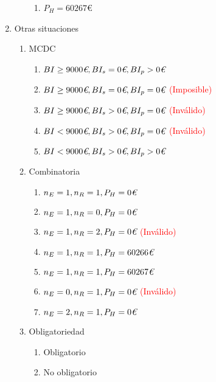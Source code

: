 \begin{enumerate}[label=\textbf{SP\arabic*.}]
\begin{enumerate}[label*=\textbf{\arabic*.}]
\begin{enumerate}[label*=\textbf{\arabic*.}]
				\item $P_{H} = 60267$€
			\end{enumerate}
		\end{enumerate}
	\item Otras situaciones
		\begin{enumerate}[label*=\textbf{\arabic*.}]
			\item MCDC
				\begin{enumerate}[label*=\textbf{\arabic*.}]
					\item $BI\geq 9000\textit{\texteuro}, BI_{s}=0\textit{\texteuro}, BI_{p}>0\textit{\texteuro}$
					\item $BI\geq 9000\textit{\texteuro}, BI_{s}=0\textit{\texteuro}, BI_{p}=0\textit{\texteuro}$ \textcolor{red}{(Imposible)}
					\item $BI\geq 9000\textit{\texteuro}, BI_{s}>0\textit{\texteuro}, BI_{p}=0\textit{\texteuro}$ \textcolor{red}{(Inválido)}
					\item $BI<9000\textit{\texteuro}, BI_{s}>0\textit{\texteuro}, BI_{p}=0\textit{\texteuro}$ \textcolor{red}{(Inválido)}
					\item $BI<9000\textit{\texteuro}, BI_{s}>0\textit{\texteuro}, BI_{p}>0\textit{\texteuro}$
				\end{enumerate}
			\item Combinatoria
				\begin{enumerate}[label*=\textbf{\arabic*.}]
					\item $n_{E}=1, n_{R}=1, P_{H}=0\textit{\texteuro}$
					\item $n_{E}=1, n_{R}=0, P_{H}=0\textit{\texteuro}$
					\item $n_{E}=1, n_{R}=2, P_{H}=0\textit{\texteuro}$ \textcolor{red}{(Inválido)}
					\item $n_{E}=1, n_{R}=1, P_{H}=60266\textit{\texteuro}$
					\item $n_{E}=1, n_{R}=1, P_{H}=60267\textit{\texteuro}$
					\item $n_{E}=0, n_{R}=1, P_{H}=0\textit{\texteuro}$ \textcolor{red}{(Inválido)}
					\item $n_{E}=2, n_{R}=1, P_{H}=0\textit{\texteuro}$
				\end{enumerate}
			\item Obligatoriedad
				\begin{enumerate}[label*=\textbf{\arabic*.}]
					\item Obligatorio
					\item No obligatorio
				\end{enumerate}
		\end{enumerate}
\end{enumerate}


